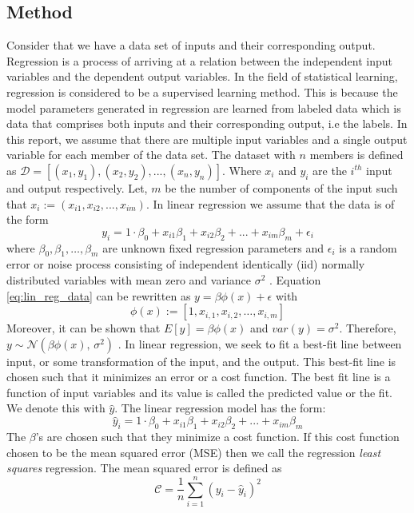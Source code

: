 \subsection{Method} \label{subsec:method_linear_regression}

Consider that we have a data set of inputs and their corresponding output. Regression is a process of arriving at a relation between the independent input variables and the dependent output variables. In the field of statistical learning, regression is considered to be a supervised learning method. This is because the model parameters generated in regression are learned from labeled data which is data that comprises both inputs and their corresponding output, i.e the labels. In this report, we assume that there are multiple input variables and a single output variable for each member of the data set.
\newline \newline
The dataset with $n$ members is defined as $\mathcal{D} = [({x}_1, y_1 ), ({x}_2, y_2 ), ..., ({x}_n, y_n )]$. Where ${x}_i$ and $y_i$  are the $i^{th}$ input and output respectively. Let, $m$ be the number of components of the input such that ${x}_i := (x_{i1}, x_{i2}, ..., x_{im})$. In linear regression we assume that the data is of the form
\begin{equation}
    {y}_i = 1 \cdot\beta_0 + x_{i1}\beta_1 + x_{i2}\beta_2 + ... + x_{im}\beta_m + \epsilon_i \label{eq:lin_reg_data}
\end{equation}
where $\beta_0, \beta_1, \dots, \beta_m$ are unknown fixed regression parameters and $\epsilon_i$ is a random error or noise process consisting of independent identically (iid) normally distributed variables with mean zero and variance $\sigma^2$ \cite{shumway_time_2017}. Equation \ref{eq:lin_reg_data} can be rewritten as $y=\beta \phi(x) + \epsilon$ with
\begin{equation}
    \phi(x):=[1, x_{i,1}, x_{i,2}, \dots, x_{i,m}]
\end{equation}
Moreover, it can be shown that $E[y] = \beta \phi(x)$ and $var(y) = \sigma^2$. Therefore, $y \sim \mathcal{N}(\beta \phi(x),\,\sigma^{2})$ \cite{murphy_machine_2012}.
\newline \newline
In linear regression, we seek to fit a best-fit line between input, or some transformation of the input, and the output. This best-fit line is chosen such that it minimizes an error or a cost function. The best fit line is a function of input variables and its value is called the predicted value or the fit. We denote this with $\hat{y}$. The linear regression model has the form:
\begin{equation}
    \hat{y}_i = 1 \cdot\beta_0 + x_{i1}\beta_1 + x_{i2}\beta_2 + ... + x_{im}\beta_m
\end{equation}
The $\beta$'s are chosen such that they minimize a cost function. If this cost function chosen to be the mean squared error (MSE) then we call the regression \textit{least squares} regression. The mean squared error is defined as 
\begin{equation}
    \mathcal{C} = \frac{1}{n}\sum_{i=1}^{n}(y_i-\hat{y}_i)^2 \label{eq:cost_function_sum}
\end{equation}

